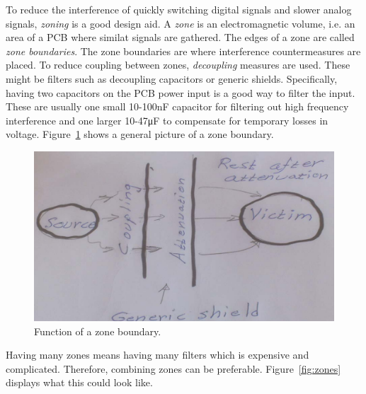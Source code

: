 To reduce the interference of quickly switching digital signals and slower
analog signals, \textit{zoning} is a good design aid. A \textit{zone} is an
electromagnetic volume, i.e. an area of a PCB where similat signals are
gathered. The edges of a zone are called \textit{zone boundaries}. The zone
boundaries are where interference countermeasures are placed. To reduce coupling
between zones, \textit{decoupling} measures are used. These might be filters
such as decoupling capacitors or generic shields. Specifically, having two
capacitors on the PCB power input is a good way to filter the input. These are
usually one small 10-100\si{\nano\farad} capacitor for filtering out high
frequency interference and one larger 10-47\si{\micro\farad} to compensate for
temporary losses in voltage.
Figure~\ref{fig:zoneboundary} shows a general picture of a zone boundary.
\begin{figure}[H]
    \centering
    \includegraphics[scale=0.3]{./figures/FIG_zoneboundary.png}
    \caption{Function of a zone boundary.}
    \label{fig:zoneboundary}
\end{figure}
Having many zones means having many filters which is expensive and complicated.
Therefore, combining zones can be preferable. Figure~\ref{fig:zones} displays
what this could look like.
